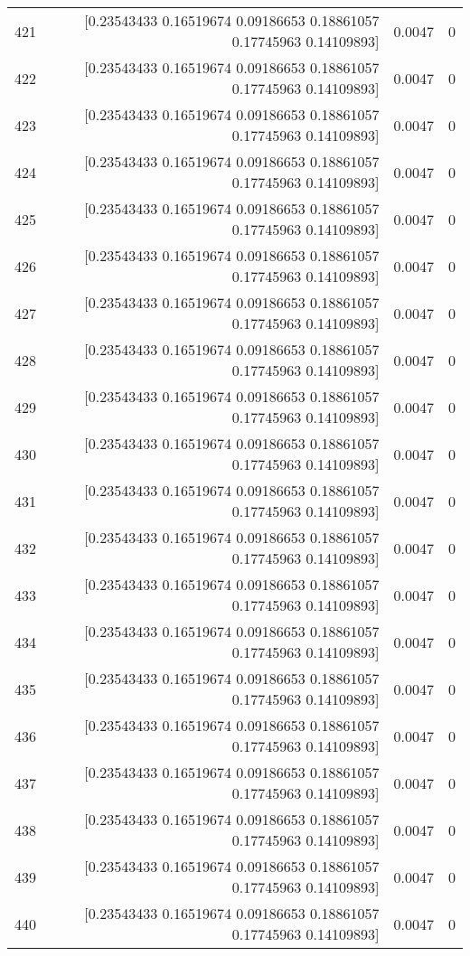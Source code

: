 \begin{longtable}{lrrr}
421 & [0.23543433 0.16519674 0.09186653 0.18861057 0.17745963 0.14109893] & 0.0047 & 0 \\
422 & [0.23543433 0.16519674 0.09186653 0.18861057 0.17745963 0.14109893] & 0.0047 & 0 \\
423 & [0.23543433 0.16519674 0.09186653 0.18861057 0.17745963 0.14109893] & 0.0047 & 0 \\
424 & [0.23543433 0.16519674 0.09186653 0.18861057 0.17745963 0.14109893] & 0.0047 & 0 \\
425 & [0.23543433 0.16519674 0.09186653 0.18861057 0.17745963 0.14109893] & 0.0047 & 0 \\
426 & [0.23543433 0.16519674 0.09186653 0.18861057 0.17745963 0.14109893] & 0.0047 & 0 \\
427 & [0.23543433 0.16519674 0.09186653 0.18861057 0.17745963 0.14109893] & 0.0047 & 0 \\
428 & [0.23543433 0.16519674 0.09186653 0.18861057 0.17745963 0.14109893] & 0.0047 & 0 \\
429 & [0.23543433 0.16519674 0.09186653 0.18861057 0.17745963 0.14109893] & 0.0047 & 0 \\
430 & [0.23543433 0.16519674 0.09186653 0.18861057 0.17745963 0.14109893] & 0.0047 & 0 \\
431 & [0.23543433 0.16519674 0.09186653 0.18861057 0.17745963 0.14109893] & 0.0047 & 0 \\
432 & [0.23543433 0.16519674 0.09186653 0.18861057 0.17745963 0.14109893] & 0.0047 & 0 \\
433 & [0.23543433 0.16519674 0.09186653 0.18861057 0.17745963 0.14109893] & 0.0047 & 0 \\
434 & [0.23543433 0.16519674 0.09186653 0.18861057 0.17745963 0.14109893] & 0.0047 & 0 \\
435 & [0.23543433 0.16519674 0.09186653 0.18861057 0.17745963 0.14109893] & 0.0047 & 0 \\
436 & [0.23543433 0.16519674 0.09186653 0.18861057 0.17745963 0.14109893] & 0.0047 & 0 \\
437 & [0.23543433 0.16519674 0.09186653 0.18861057 0.17745963 0.14109893] & 0.0047 & 0 \\
438 & [0.23543433 0.16519674 0.09186653 0.18861057 0.17745963 0.14109893] & 0.0047 & 0 \\
439 & [0.23543433 0.16519674 0.09186653 0.18861057 0.17745963 0.14109893] & 0.0047 & 0 \\
440 & [0.23543433 0.16519674 0.09186653 0.18861057 0.17745963 0.14109893] & 0.0047 & 0 \\

\end{longtable}
